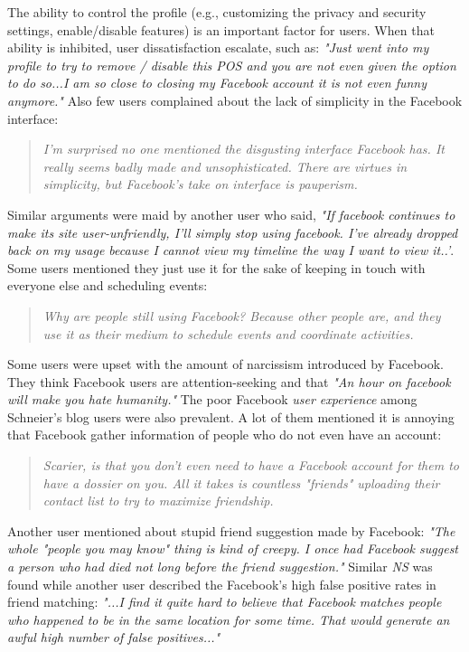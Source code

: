     The ability to control the profile (e.g., customizing the privacy and security settings, enable/disable features) is an important factor for users. When that ability is inhibited, user dissatisfaction escalate, such as: \textit{"Just went into my profile to try to remove / disable this POS and you are not even given the option to do so...I am so close to closing my Facebook account it is not even funny anymore."} Also few users complained about the lack of simplicity in the Facebook interface:
    \begin{quote}
         \textit{I'm surprised no one mentioned the disgusting interface Facebook has. It really seems badly made and unsophisticated. There are virtues in simplicity, but Facebook's take on interface is pauperism.}
    \end{quote}
    
    Similar arguments were maid by another user who said, \textit{"If facebook continues to make its site user-unfriendly, I'll simply stop using facebook. I've already dropped back on my usage because I cannot view my timeline the way I want to view it..'}. Some users mentioned they just use it for the sake of keeping in touch with everyone else and scheduling events:
    \begin{quote}
         \textit{Why are people still using Facebook? Because other people are, and they use it as their medium to schedule events and coordinate activities. }
    \end{quote}
    
    Some users were upset with the amount of narcissism introduced by Facebook. They think Facebook users are attention-seeking and that \textit{"An hour on facebook will make you hate humanity."} 
The poor Facebook \textit{user experience} among Schneier's blog users were also prevalent. A lot of them mentioned it is annoying that Facebook gather information of people who do not even have an account:

\begin{quote}
         \textit{Scarier, is that you don't even need to have a Facebook account for them to have a dossier on you. All it takes is countless "friends" uploading their contact list to try to maximize friendship. }

         
\end{quote}

Another user mentioned about stupid friend suggestion made by Facebook: \textit{"The whole "people you may know" thing is kind of creepy. I once had Facebook suggest a person who had died not long before the friend suggestion."} Similar \emph{NS} was found while another user described the Facebook's high false positive rates in friend matching: \textit{"...I find it quite hard to believe that Facebook matches people who happened to be in the same location for some time. That would generate an awful high number of false positives..."} 
    
